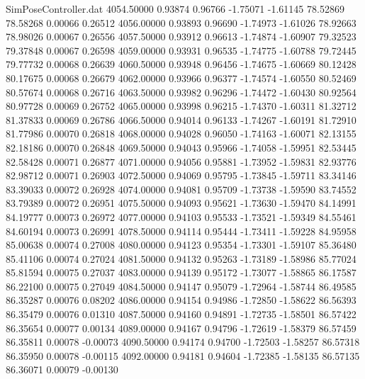 \begin{filecontents}{SimPoseController.dat}
4054.50000    0.93874    0.96766    -1.75071   -1.61145   78.52869   78.58268    0.00066    0.26512
4056.00000    0.93893    0.96690    -1.74973   -1.61026   78.92663   78.98026    0.00067    0.26556
4057.50000    0.93912    0.96613    -1.74874   -1.60907   79.32523   79.37848    0.00067    0.26598
4059.00000    0.93931    0.96535    -1.74775   -1.60788   79.72445   79.77732    0.00068    0.26639
4060.50000    0.93948    0.96456    -1.74675   -1.60669   80.12428   80.17675    0.00068    0.26679
4062.00000    0.93966    0.96377    -1.74574   -1.60550   80.52469   80.57674    0.00068    0.26716
4063.50000    0.93982    0.96296    -1.74472   -1.60430   80.92564   80.97728    0.00069    0.26752
4065.00000    0.93998    0.96215    -1.74370   -1.60311   81.32712   81.37833    0.00069    0.26786
4066.50000    0.94014    0.96133    -1.74267   -1.60191   81.72910   81.77986    0.00070    0.26818
4068.00000    0.94028    0.96050    -1.74163   -1.60071   82.13155   82.18186    0.00070    0.26848
4069.50000    0.94043    0.95966    -1.74058   -1.59951   82.53445   82.58428    0.00071    0.26877
4071.00000    0.94056    0.95881    -1.73952   -1.59831   82.93776   82.98712    0.00071    0.26903
4072.50000    0.94069    0.95795    -1.73845   -1.59711   83.34146   83.39033    0.00072    0.26928
4074.00000    0.94081    0.95709    -1.73738   -1.59590   83.74552   83.79389    0.00072    0.26951
4075.50000    0.94093    0.95621    -1.73630   -1.59470   84.14991   84.19777    0.00073    0.26972
4077.00000    0.94103    0.95533    -1.73521   -1.59349   84.55461   84.60194    0.00073    0.26991
4078.50000    0.94114    0.95444    -1.73411   -1.59228   84.95958   85.00638    0.00074    0.27008
4080.00000    0.94123    0.95354    -1.73301   -1.59107   85.36480   85.41106    0.00074    0.27024
4081.50000    0.94132    0.95263    -1.73189   -1.58986   85.77024   85.81594    0.00075    0.27037
4083.00000    0.94139    0.95172    -1.73077   -1.58865   86.17587   86.22100    0.00075    0.27049
4084.50000    0.94147    0.95079    -1.72964   -1.58744   86.49585   86.35287    0.00076    0.08202
4086.00000    0.94154    0.94986    -1.72850   -1.58622   86.56393   86.35479    0.00076    0.01310
4087.50000    0.94160    0.94891    -1.72735   -1.58501   86.57422   86.35654    0.00077    0.00134
4089.00000    0.94167    0.94796    -1.72619   -1.58379   86.57459   86.35811    0.00078   -0.00073
4090.50000    0.94174    0.94700    -1.72503   -1.58257   86.57318   86.35950    0.00078   -0.00115
4092.00000    0.94181    0.94604    -1.72385   -1.58135   86.57135   86.36071    0.00079   -0.00130

\end{filecontents}
